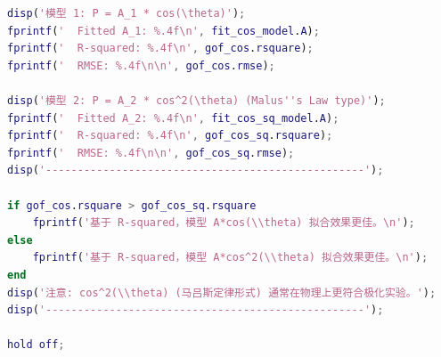 \documentclass[12pt,a4paper,UTF8]{article}
\begin{document}
\begin{lstlisting}[language=matlab, caption=Code2]
disp('模型 1: P = A_1 * cos(\theta)');
fprintf('  Fitted A_1: %.4f\n', fit_cos_model.A);
fprintf('  R-squared: %.4f\n', gof_cos.rsquare);
fprintf('  RMSE: %.4f\n\n', gof_cos.rmse);

disp('模型 2: P = A_2 * cos^2(\theta) (Malus''s Law type)');
fprintf('  Fitted A_2: %.4f\n', fit_cos_sq_model.A);
fprintf('  R-squared: %.4f\n', gof_cos_sq.rsquare);
fprintf('  RMSE: %.4f\n\n', gof_cos_sq.rmse);
disp('--------------------------------------------------');

if gof_cos.rsquare > gof_cos_sq.rsquare
    fprintf('基于 R-squared，模型 A*cos(\\theta) 拟合效果更佳。\n');
else
    fprintf('基于 R-squared，模型 A*cos^2(\\theta) 拟合效果更佳。\n');
end
disp('注意: cos^2(\\theta) (马吕斯定律形式) 通常在物理上更符合极化实验。');
disp('--------------------------------------------------');

hold off;
\end{lstlisting}
\end{document}
